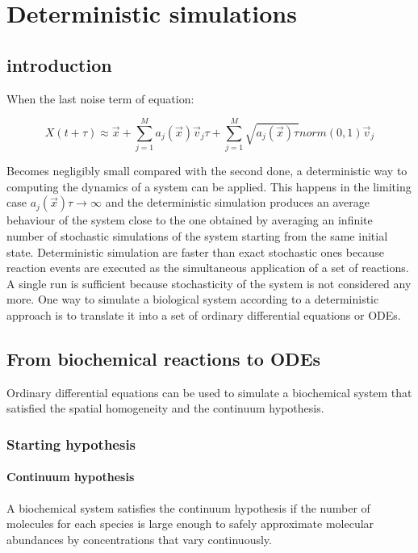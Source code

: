 \graphicspath{{chapters/05/images/}}
\chapter{Deterministic simulations}

\section{introduction}
When the last noise term of equation:

$$X(t+\tau)\approx \vec{x}+\sum\limits_{j=1}^Ma_j(\vec{x})\vec{v}_j\tau + \sum\limits_{j=1}^M\sqrt{a_j(\vec{x})\tau}norm(0,1)\vec{v}_j$$

Becomes negligibly small compared with the second done, a deterministic way to computing the dynamics of a system can be applied.
This happens in the limiting case $a_j(\vec{x})\tau\rightarrow\infty$ and the deterministic simulation produces an average behaviour of the system close to the one obtained by averaging an infinite number of stochastic simulations of the system starting from the same initial state.
Deterministic simulation are faster than exact stochastic ones because reaction events are executed as the simultaneous application of a set of reactions.
A single run is sufficient because stochasticity of the system is not considered any more.
One way to simulate a biological system according to a deterministic approach is to translate it into a set of ordinary differential equations or ODEs.

\section{From biochemical reactions to ODEs}
Ordinary differential equations can be used to simulate a biochemical system that satisfied the spatial homogeneity and the continuum hypothesis.

  \subsection{Starting hypothesis}

    \subsubsection{Continuum hypothesis}
    A biochemical system satisfies the continuum hypothesis if the number of molecules for each species is large enough to safely approximate molecular abundances by concentrations that vary continuously.

